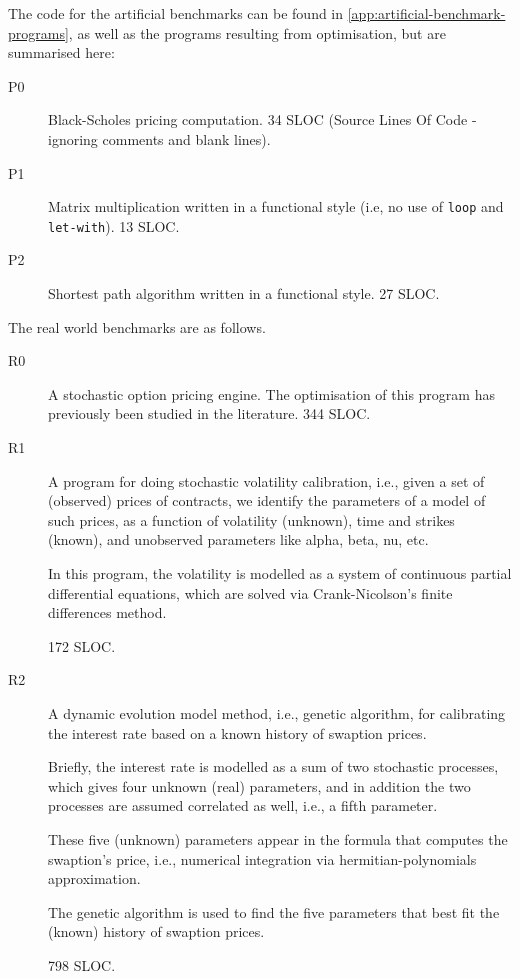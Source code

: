 The code for the artificial benchmarks can be found in
\cref{app:artificial-benchmark-programs}, as well as the programs
resulting from optimisation, but are summarised here:

\begin{description}
\item[P0] Black-Scholes\cite{black1973pricing} pricing computation.
  34 SLOC (Source Lines Of Code - ignoring comments and blank lines).

\item[P1] Matrix multiplication written in a functional style (i.e, no
  use of \texttt{loop} and \texttt{let-with}).  13 SLOC.

\item[P2] Shortest path algorithm written in a functional style.  27
  SLOC.
\end{description}

The real world benchmarks are as follows.

\begin{description}
\item[R0] A stochastic option pricing engine. The optimisation of this
  program has previously been studied in the
  literature\cite{LexiFiPricing}.  344 SLOC.

\item[R1] A program for doing stochastic volatility calibration, i.e.,
  given a set of (observed) prices of contracts, we identify the
  parameters of a model of such prices, as a function of volatility
  (unknown), time and strikes (known), and unobserved parameters like
  alpha, beta, nu, etc.

  In this program, the volatility is modelled as a system of
  continuous partial differential equations, which are solved via
  Crank-Nicolson's finite differences
  method\cite{crank-nicolson-method}.

  172 SLOC.

\item[R2] A dynamic evolution model method, i.e., genetic algorithm,
  for calibrating the interest rate based on a known history of
  swaption prices.

  Briefly, the interest rate is modelled as a sum of two stochastic
  processes, which gives four unknown (real) parameters, and in
  addition the two processes are assumed correlated as well, i.e., a
  fifth parameter.

  These five (unknown) parameters appear in the formula that computes
  the swaption's price, i.e., numerical integration via
  hermitian-polynomials approximation.

  The genetic algorithm is used to find the five parameters that best
  fit the (known) history of swaption prices.

  798 SLOC.

\end{description}

